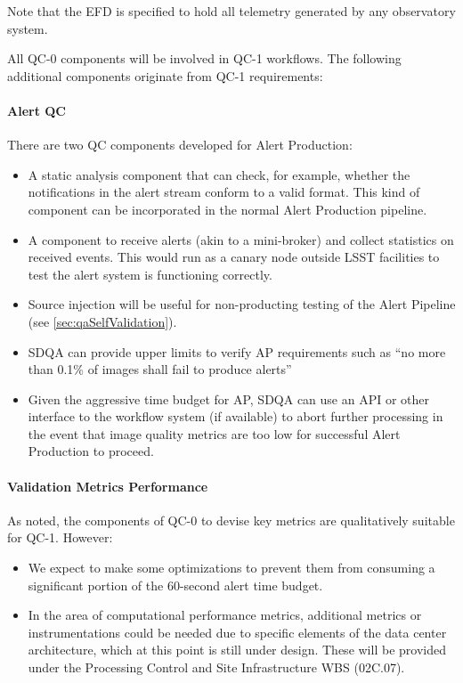 Note that the EFD is specified to hold all telemetry generated by any observatory system.

All QC-0 components will be involved in QC-1 workflows. The following additional components originate from QC-1 requirements:

\paragraph{Alert QC}
\label{sec:qaAlertQA}

There are two QC components developed for Alert Production:

\begin{itemize}

\item A static analysis component that can check, for example, whether the notifications in the alert stream conform to a valid format. This kind of component can be incorporated in the normal Alert Production pipeline.

\item A component to receive alerts (akin to a mini-broker) and collect statistics on received events. This would run as a canary node outside LSST facilities to test the alert system is functioning correctly.

\item Source injection will be useful for non-producting testing of the Alert Pipeline (see \ref{sec:qaSelfValidation}).

\item SDQA can provide upper limits to verify AP requirements such as ``no more than 0.1\% of images shall fail to produce alerts''

\item Given the aggressive time budget for AP, SDQA can use an API or other interface to the workflow system (if available) to abort further processing in the event that image quality metrics are too low for successful Alert Production to proceed.

\end{itemize}

\paragraph{Validation Metrics Performance}
\label{sec:qaPerfValidate}

As noted, the components of QC-0 to devise key metrics are qualitatively suitable for QC-1. However:

\begin{itemize}

\item We expect to make some optimizations to prevent them from consuming a significant portion of the 60-second alert time budget.

\item In the area of computational performance metrics, additional metrics or instrumentations could be needed due to specific elements of the data center architecture, which at this point is still under design. These will be provided under the Processing Control and Site Infrastructure WBS (02C.07).

\end{itemize}

